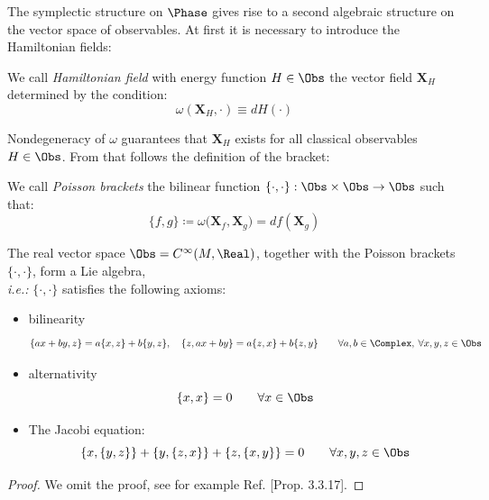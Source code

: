 \documentclass[Main]{subfiles}
\begin{document}
	\vspace{2mm}
	The symplectic structure on $\Phase$ gives rise to a second algebraic structure on the vector space of observables.
	At first it is necessary to introduce the Hamiltonian fields:
	\begin{definition}
		We call \emph{Hamiltonian field} with energy function $H\in \Obs$
		the vector field $\mathbf{X}_H$ determined by the condition:
		\begin{displaymath}
			\omega( \mathbf{X}_H,  \cdot )\equiv dH (\cdot)
		\end{displaymath}
	\end{definition}
	Nondegeneracy of $\omega$ guarantees that $\mathbf{X}_H$ exists for all classical observables $H\in \Obs$.
	From that follows the definition of the bracket:
	\begin{definition}
		We call \emph{Poisson brackets}
		the bilinear function 	$\{\cdot, \cdot\} : \Obs \times \Obs \rightarrow \Obs$ such that:
		\begin{equation}
			\{ f, g \} \coloneqq \omega \big( \mathbf{X}_f , \mathbf{X}_g \big) = df ( \mathbf{X}_g)
		\end{equation}
	\end{definition}
	\begin{proposition}
		The real vector space $\Obs= C^\infty(M,\Real)$, together with the Poisson brackets $\{\cdot, \cdot\}$, form a Lie algebra,\\
		\textit{i.e.:} $\{\cdot,\cdot\}$ satisfies  the following axioms:
		\begin{itemize}
			\item bilinearity
				\begin{displaymath}
					\{a x + b y, z\} = a \{x, z\} + b \{y, z\}, \quad  \{z, a x + b y\} = a\{z, x\}+ b \{z, y\} \qquad \forall a,b \in \Complex , \: \forall x,y,z \in \Obs
				\end{displaymath}
			\item alternativity
				\begin{displaymath}
						\{x,x\}= 0 \qquad \forall x \in \Obs
				\end{displaymath}
			\item The Jacobi equation:
				\begin{displaymath}
					\{x, \{ y , z \} \} + \{y, \{ z , x \} \} + \{z, \{ x , y \} \} = 0 \qquad \forall x,y,z \in \Obs
				\end{displaymath}
		\end{itemize}
	\end{proposition}
	\begin{proof}
		We omit the proof, see for example Ref. \cite{Abraham1978}[Prop. 3.3.17].
	\end{proof}
	
\end{document}
